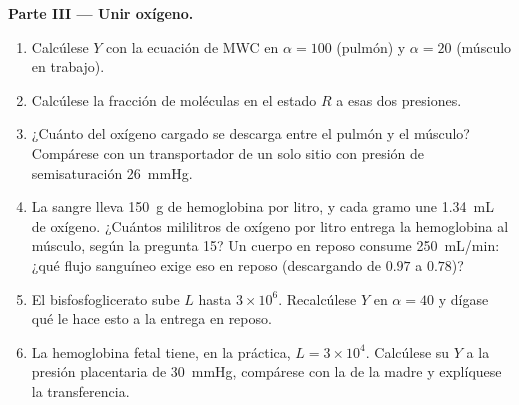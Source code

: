 \begin{problem}
\medskip
\noindent\textbf{Parte III --- Unir oxígeno.}
\begin{enumerate}[resume]
  \item Calcúlese $Y$ con la ecuación de MWC en $\alpha = 100$ (pulmón)
        y $\alpha = 20$ (músculo en trabajo).
  \item Calcúlese la fracción de moléculas en el estado $R$ a esas dos
        presiones.
  \item ¿Cuánto del oxígeno cargado se descarga entre el pulmón y el
        músculo? Compárese con un transportador de un solo sitio con
        presión de semisaturación \qty{26}{mmHg}.
  \item La sangre lleva \qty{150}{g} de hemoglobina por litro, y cada
        gramo une \qty{1.34}{mL} de oxígeno. ¿Cuántos mililitros de
        oxígeno por litro entrega la hemoglobina al músculo, según la
        pregunta 15? Un cuerpo en reposo consume \qty{250}{mL/min}:
        ¿qué flujo sanguíneo exige eso en reposo (descargando de $0.97$
        a $0.78$)?
  \item El bisfosfoglicerato sube $L$ hasta $3\times 10^{6}$.
        Recalcúlese $Y$ en $\alpha = 40$ y dígase qué le hace esto a la
        entrega en reposo.
  \item La hemoglobina fetal tiene, en la práctica, $L = 3\times 10^{4}$.
        Calcúlese su $Y$ a la presión placentaria de \qty{30}{mmHg},
        compárese con la de la madre y explíquese la transferencia.
\end{enumerate}


\end{problem}
